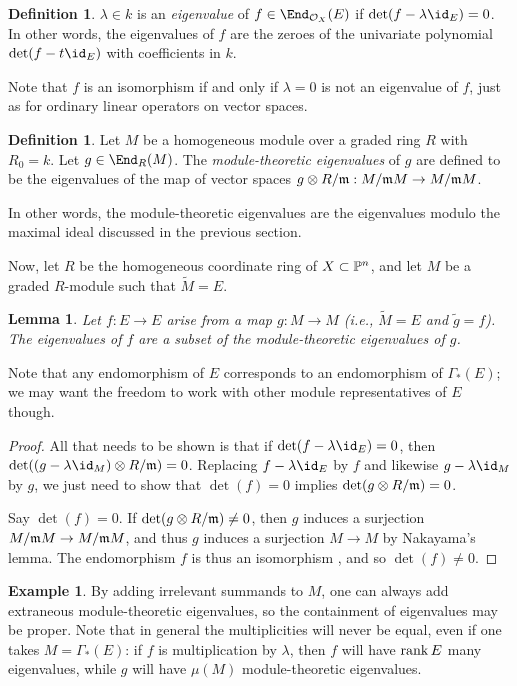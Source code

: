 \documentclass[12pt]{article}
\let\wtilde\widetilde
\def\OO{\mathcal O}
\theoremstyle{theorem}
\numberwithin{thm}{section}
\newtheorem{lem}[thm]{Lemma}
\theoremstyle{definition}
\newtheorem{dfn}[thm]{Definition}
\newtheorem{exa}[thm]{Example}
\def\defn#1{{\it #1}}
\begin{document}
\begin{dfn}
  $\lambda \in k$ is an \defn{eigenvalue} of $f \in \End_{\OO_X}(E)$ if $\det(f-\lambda \id_E)= 0$. In other words, the eigenvalues of $f$ are the zeroes of the univariate polynomial $\det(f-t\id _E)$ with coefficients in $k$.
\end{dfn}

Note that $f$ is an isomorphism if and only if $\lambda=0$ is not an eigenvalue of $f$, just as for ordinary linear operators on vector spaces.

\begin{dfn}
  Let $M$ be a homogeneous module over a graded ring $R$ with $R_0=k$.
  Let $g \in \End_R(M)$. The \defn{module-theoretic eigenvalues} of $g$ are defined to be the eigenvalues of the map of vector spaces $g\otimes R/\m:M/\m M \to M/\m M$.
\end{dfn}

In other words, the module-theoretic eigenvalues are the eigenvalues modulo the maximal ideal discussed in the previous section.


Now, let $R$ be the homogeneous coordinate ring of $X\subset \P^n$, and let $M$ be a graded $R$-module such that $\wtilde M=E$.

\begin{lem}
  Let $f:E\to E$ arise from a map $g:M\to M$ (i.e., $\wtilde M = E$ and $\wtilde g = f$).
  The eigenvalues of $f$ are a subset of the module-theoretic eigenvalues of $g$.
\end{lem}

Note that any endomorphism of $E$ corresponds to an endomorphism of $\Gamma_*(E)$; we may want the freedom to work with other module representatives of $E$ though.

\begin{proof}
  All that needs to be shown is that if $\det(f-\lambda \id_E) =0$, then $\det((g-\lambda \id_M)\otimes R/\m)=0$.
  Replacing
  $f-\lambda \id_E$
  by
  $f$
  and likewise
  $g-\lambda\id_M$
  by
  $g$,
  we just need to show that $\det(f)=0$ implies $\det(g\otimes R/\m)=0$.

  Say $\det(f)=0$.
  If $\det(g\otimes R/\m)\neq 0$, then $g$ induces a surjection $M/\m M\to M/\m M$, and thus $g$ induces a surjection $M\to M$ by Nakayama's lemma. The endomorphism $f$ is thus an isomorphism \cite[Corollary~4.4]{Eisenbud95}, and so $\det(f)\neq 0$.
\end{proof}

\begin{exa}
  By adding  irrelevant summands to $M$, one can always add extraneous module-theoretic eigenvalues, so the containment of eigenvalues may be proper.
  Note that in general the multiplicities will never be equal, even if one takes $M=\Gamma_*(E)$: if $f$ is multiplication by $\lambda$, then $f$ will have $\rank E$ many eigenvalues, while $g$ will have $\mu(M)$ module-theoretic eigenvalues.
\end{exa}
\end{document}
